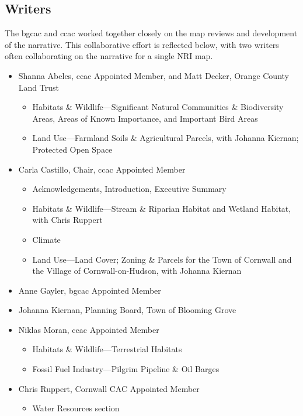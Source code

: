 \subsection*{Writers}\label{subsec:writers}
The \gls{bgcac} and \gls{ccac} worked together closely on the map 
reviews and development of the narrative. This collaborative effort is 
reflected below, with two writers often collaborating on the narrative for a 
single NRI map.
\begin{itemize}
    \item Shanna Abeles, \gls{ccac} Appointed Member, and Matt Decker, Orange 
County Land Trust
    \begin{itemize}
        \item Habitats \& Wildlife—Significant Natural Communities \& 
Biodiversity Areas, Areas of Known Importance, and Important Bird Areas
        \item Land Use—Farmland Soils \& Agricultural Parcels, with Johanna 
Kiernan; Protected Open Space
    \end{itemize}
    \item Carla Castillo, Chair, \gls{ccac} Appointed Member
    \begin{itemize}
        \item  Acknowledgements, Introduction, Executive Summary
        \item Habitats \& Wildlife—Stream \& Riparian Habitat and Wetland 
Habitat, with Chris Ruppert
        \item Climate
        \item Land Use—Land Cover; Zoning \& Parcels for the Town of Cornwall 
and the Village of Cornwall-on-Hudson, with Johanna Kiernan
    \end{itemize}
    \item Anne Gayler, \gls{bgcac} Appointed Member
    \item Johanna Kiernan, Planning Board, Town of Blooming Grove
    \item Niklas Moran, \gls{ccac} Appointed Member
    \begin{itemize}
        \item Habitats \& Wildlife—Terrestrial Habitats
        \item Fossil Fuel Industry—Pilgrim Pipeline \& Oil Barges
    \end{itemize}
    \item Chris Ruppert, Cornwall CAC Appointed Member
    \begin{itemize}
       \item Water Resources section

\end{itemize}
\end{itemize}
